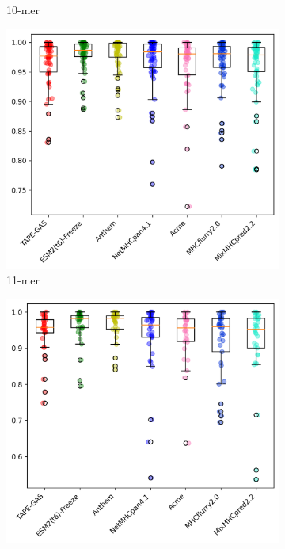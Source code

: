 \begin{figure}[h]
\begin{subfigure}[b]{0.3\textwidth}
		\caption{10-mer}
		\label{fig:comparison_10}
	\end{subfigure}
	\hfill
	\begin{subfigure}[b]{0.3\textwidth}
		\centering
		\includegraphics[width=\textwidth]{../img/results/auc_distribution_11-mer}
		\caption{11-mer}
		\label{fig:comparison_11}
	\end{subfigure}
	\hfill
	\begin{subfigure}[b]{0.3\textwidth}
		\centering
		\includegraphics[width=\textwidth]{../img/results/auc_distribution_12-mer}

\end{subfigure}
\end{figure}
